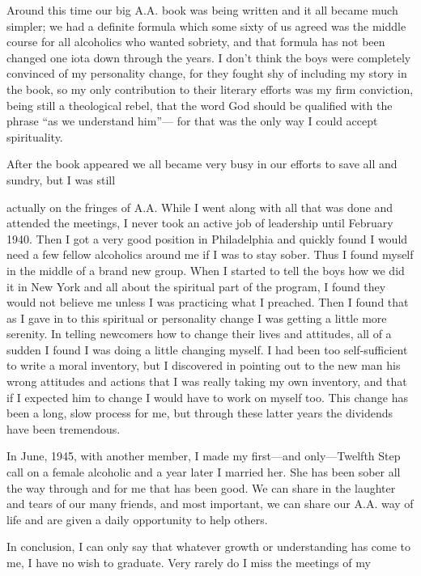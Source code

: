 \begin{biblechapter}
Around this time our big A.A. book was being written and it all became much simpler; we had a definite formula which some sixty of us agreed was the middle course for all alcoholics who wanted sobriety, and that formula has not been changed one iota down through the years. I don’t think the boys were completely convinced of my personality change, for they fought shy of including my story in the book, so my only contribution to their literary efforts was my firm conviction, being still a theological rebel, that the word God should be qualified with the phrase “as we understand him”— for that was the only way I could accept spirituality.

After the book appeared we all became very busy in our efforts to save all and sundry, but I was still

actually on the fringes of A.A. While I went along with all that was done and attended the meetings, I never took an active job of leadership until February 1940. Then I got a very good position in Philadelphia and quickly found I would need a few fellow alcoholics around me if I was to stay sober. Thus I found myself in the middle of a brand new group. When I started to tell the boys how we did it in New York and all about the spiritual part of the program, I found they would not believe me unless I was practicing what I preached. Then I found that as I gave in to this spiritual or personality change I was getting a little more serenity. In telling newcomers how to change their lives and attitudes, all of a sudden I found I was doing a little changing myself. I had been too self-sufficient to write a moral inventory, but I discovered in pointing out to the new man his wrong attitudes and actions that I was really taking my own inventory, and that if I expected him to change I would have to work on myself too. This change has been a long, slow process for me, but through these latter years the dividends have been tremendous.

In June, 1945, with another member, I made my first—and only—Twelfth Step call on a female alcoholic and a year later I married her. She has been sober all the way through and for me that has been good. We can share in the laughter and tears of our many friends, and most important, we can share our A.A. way of life and are given a daily opportunity to help others.

In conclusion, I can only say that whatever growth or understanding has come to me, I have no wish to graduate. Very rarely do I miss the meetings of my


\end{biblechapter}
